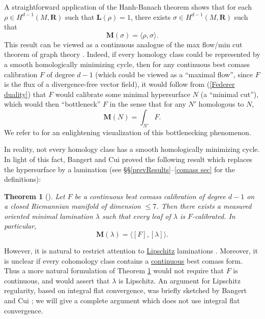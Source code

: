 \documentclass[reqno,11pt]{amsart}
\newcommand{\RR}{\mathbf{R}}
\newcommand{\Mass}{\mathbf M}
\newcommand{\Comass}{\mathbf L}
\newtheorem{theorem}{Theorem}[section]
\theoremstyle{definition}
\numberwithin{equation}{section}
\begin{document}
A straightforward application of the Hanh-Banach theorem shows that for each $\rho \in H^{d - 1}(M, \RR)$ such that $\Comass(\rho) = 1$, there exists $\sigma \in H^{d - 1}(M, \RR)$ such that
\begin{equation}\label{Federer duality}
\Mass(\sigma) = \langle \rho, \sigma\rangle.
\end{equation}
This result can be viewed as a continuous analogue of the max flow/min cut theorem of graph theory \cite{sullivan1990crystalline,Freedman_2016}.
Indeed, if every homology class could be represented by a smooth homologically minimizing cycle, then for any continuous best comass calibration $F$ of degree $d - 1$ (which could be viewed as a ``maximal flow'', since $F$ is the flux of a divergence-free vector field), it would follow from (\ref{Federer duality}) that $F$ would calibrate some minimal hypersurface $N$ (a ``minimal cut''), which would then ``bottleneck'' $F$ in the sense that for any $N'$ homologous to $N$,
$$\Mass(N) = \int_{N'} F.$$
We refer to \cite[Figure 5]{Freedman_2016} for an enlightening visualization of this bottlenecking phenomenon.

In reality, not every homology class has a smooth homologically minimizing cycle.
In light of this fact, Bangert and Cui proved the following result which replaces the hypersurface by a lamination (see \S\S\ref{prevResults}--\ref{comass sec} for the definitions):

\begin{theorem}[{\cite{bangert_cui_2017}}]\label{BangertCui}
Let $F$ be a continuous best comass calibration of degree $d - 1$ on a closed Riemannian manifold of dimension $\leq 7$.
Then there exists a measured oriented minimal lamination $\lambda$ such that every leaf of $\lambda$ is $F$-calibrated.
In particular, 
$$\Mass(\lambda) = \langle [F], [\lambda] \rangle.$$
\end{theorem}

However, it is natural to restrict attention to \underline{Lipschitz} laminations \cite[Remark 2.3]{bangert_cui_2017}.
Moreover, it is unclear if every cohomology class contains a \underline{continuous} best comass form.
Thus a more natural formulation of Theorem \ref{BangertCui} would not require that $F$ is continuous, and would assert that $\lambda$ is Lipschitz.
An argument for Lipschitz regularity, based on integral flat convergence, was briefly sketched by Bangert and Cui \cite[Remark 2.10]{bangert_cui_2017}; we will give a complete argument which does not use integral flat convergence.
\end{document}
